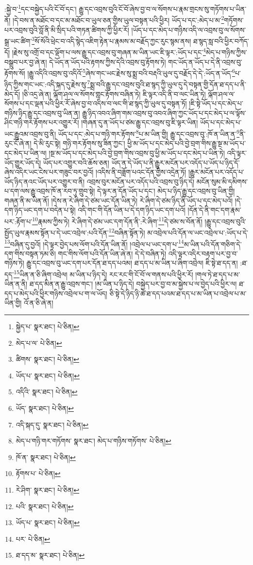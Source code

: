 :སྐྱེ་བ་\footnote{སྐྱེད་པ་  སྣར་ཐང་།  པེ་ཅིན། }དང་བསྐྱེད་པའི་ངོ་བོ་དང་། རྒྱུ་དང་འབྲས་བུའི་ངོ་བོ་ཞེས་བྱ་བ་ལ་སོགས་པ་རྣམ་གྲངས་སུ་གཏོགས་པ་ཡིན་ནོ། །དེ་བས་ན་མཐོང་བ་དང་མ་མཐོང་བ་ཡུལ་ཅན་གྱིས་ཡུལ་བསྟན་པའི་ཕྱིར། ཡོད་པ་དང་:མེད་པ་མ་\footnote{མེད་པ་ལ་  པེ་ཅིན། }གཏོགས་པར་འབྲས་བུའི་བློ་ནི་མི་སྲིད་པའི་གཏན་ཚིགས་ཀྱི་ཕྱིར་རོ། །ཡོད་པ་དང་མེད་པ་གཉིས་འདི་ལ་འབྲས་བུ་ལ་སོགས་སྒྲ་ཡང་ཚིག་\footnote{ཚིགས་  སྣར་ཐང་།  པེ་ཅིན། }སོ་སོའི་ཕྲེང་བ་འདི་སྙེད་འཇིག་རྟེན་པ་རྣམས་མ་བརྗོད་ཀྱང་རུང་སྙམ་ནས། ཐ་སྙད་སླ་བའི་ཕྱིར་བཀོད་དོ། །རྗེས་སུ་འགྲོ་བ་དང་ལྡོག་པ་ལས་རྒྱུ་དང་འབྲས་བུ་གཞན་མ་ཡིན་ཡང་ཇི་ལྟར་:ཡོད་པ་དང་\footnote{ཡོད་པ་  སྣར་ཐང་།  པེ་ཅིན། }མེད་པ་གཉིས་ཀྱིས་བསྒྲུབ་པར་བྱ་ཞེ་ན། དེ་ཡོད་ན་ཡོད་པའི་རྟགས་ཀྱིས་དེའི་འབྲས་བུ་རྟོགས་ཏེ། གང་ཡོད་ན་ཡོད་པ་དེ་ནི་འབྲས་བུ་རྟོགས་སོ། །རྒྱུ་འདིའི་འབྲས་བུ་འདིའོ་\footnote{འདིའི་  སྣར་ཐང་།  པེ་ཅིན། }ཞེས་གང་ཡང་རྗེས་སུ་སྨྲ་བའི་བརྡའི་ཡུལ་དུ་བརྗོད་དེ་དེ་:ཡོད་ན་ཡོད་\footnote{ཡོད་  སྣར་ཐང་།  པེ་ཅིན། }པ་ཉིད་ཀྱིས་གང་ཡང་:འདི་སྐད་དུ་རྗེས་སུ་\footnote{འདི་སྐད་དུ་  སྣར་ཐང་།  པེ་ཅིན། }སྨྲ་བའི་རྒྱུ་དང་འབྲས་བུའི་ཐ་སྙད་ཀྱི་ཡུལ་དུ་དེ་བསྟན་གྱི་དོན་ཐ་དད་པ་ནི་མེད་དོ། །ཅི་འདྲ་ཞེ་ན། ལྐོག་ཤལ་ལ་སོགས་གླང་རྟོགས་བཞིན་ཏེ། ཇི་ལྟར་འདི་ནི་བ་ལང་ཡིན་ཏེ། ལྐོག་ཤལ་ལ་སོགས་པ་དང་ལྡན་པའི་ཕྱིར་རོ་ཞེས་བྱ་བ་འདིས་བ་ལང་གི་ཐ་སྙད་ཀྱི་ཡུལ་དུ་བསྟན་ཏོ། །ཇི་སྟེ་ཡོད་པ་དང་མེད་པ་གཉིས་ཉིད་རྒྱུ་དང་འབྲས་བུ་ཡིན་ན། རྒྱུ་ཉིད་འབའ་ཞིག་གམ་འབྲས་བུ་འབའ་ཞིག་ཀྱང་ཡོད་པ་དང་མེད་པ་ལ་ལྟོས་ཤིང་གཉི་གར་རྟོགས་པར་འགྱུར་རོ། །གཞན་དུ་ན་ཡོད་པ་ཙམ་རྒྱུ་དང་འབྲས་བུ་ཇི་ལྟར་ཡིན། ཡོད་པ་དང་མེད་པ་ཡང་རྒྱུའམ་འབྲས་བུ་ནི། ཡོད་པ་དང་:མེད་པ་གཉི་གར་རྟོགས་\footnote{མེད་པ་གཉི་གར་གཏོགས་  སྣར་ཐང་། མེད་པ་གཉིས་གཏོགས་  པེ་ཅིན། }པ་མ་ཡིན་གྱི། རྒྱུ་དང་འབྲས་བུ་:ཁོ་ན་ཡིན་ན་\footnote{ཁོ་ན་  སྣར་ཐང་།  པེ་ཅིན། }ནི་རུང་ངོ་ཞེ་ན། དེ་མི་རུང་སྟེ། གཉི་གར་རྟོགས་སུ་ཟིན་ཀྱང་། ཕྱི་མ་ཡོད་པ་དང་མེད་པའི་བྱེ་བྲག་གིས་རྒྱུ་སྔ་མ་ཡོད་པ་དང་མེད་པ་ཡིན་ལ། །སྔ་མ་ཡོད་པ་དང་མེད་པའི་བྱེ་བྲག་གིས་འབྲས་བུ་ཕྱི་མ་ཡོད་པ་དང་མེད་པ་ཡིན་ཏེ། འདི་ལྟར་ཡོད་གྱུར་ཡོད་དེ། ཡོད་པར་འགྱུར་བའི་ཆོས་ཅན། ཡོད་ན་དེ་ཡོད་པ་ནི་རྒྱུར་མངོན་པར་འདོད་པ་ཡོད་པ་ཉིད་དོ་ཞེས་འདིར་ཡང་ངེས་པར་གཟུང་བར་བྱའོ། །འདིས་ནི་བཟློག་པའང་དོན་གྱིས་འདྲེན་ཏོ། །རྒྱུར་མངོན་པར་འདོད་པ་ཡོད་ཉིད་ནའང་ཡོད་པར་འགྱུར་བ་ནི། འབྲས་བུར་མངོན་པར་འདོད་པའི་འབྲས་བུ་ཉིད་དེ། མངོན་སུམ་མི་དམིགས་པ་དག་ལས་རྒྱུ་འབྲས་ཁོ་ན་རབ་ཏུ་གྲུབ་སྟེ། དེ་ལྟར་ན་དོན་ཡོད་པ་དང་། མེད་པ་ཉིད་རྒྱུ་དང་འབྲས་བུ་ཡིན་གྱི། གཞན་ནི་མ་ཡིན་ནོ། །དེས་ན་རེ་ཞིག་དེ་ཙམ་ཡང་དོན་ཡིན་ཏེ། རེ་ཞིག་དེ་ཙམ་ཉིད་ནི་ཡོད་པ་དང་མེད་པའོ། །དེ་དག་ཉིད་ཡང་དག་པ་བདེན་པ་སྟེ། འདི་གང་གི་དོན་ཡིན་པ་དེ་དག་ཉིད་ཡང་དག་པའོ། །དོན་དེ་ནི་གང་དག་རྣམ་པར་:རྟོག་པ་\footnote{རྟོགས་པ་  པེ་ཅིན། }རྣམས་ཀྱིས་ཏེ། རེ་ཞིག་དེ་ཙམ་ཡང་དག་དོན་ནི་:རེ་ཞིག་\footnote{རེ་ཤིག་  སྣར་ཐང་།  པེ་ཅིན། }དེ་ཙམ་ས་བོན་ནོ། །རྒྱུ་དང་འབྲས་བུའི་སྤྱོད་ཡུལ་རྣམས་སྟོན་པ་དེ་ཡང་འབྲེལ་:པའི་དོན་\footnote{པའི་  སྣར་ཐང་།  པེ་ཅིན། }བཞིན་སྟོན་ཏེ། མ་འབྲེལ་པའི་དོན་ལ་ཡང་འབྲེལ་པ་:ཡོད་པ་དེ་\footnote{ཡོད་པ་  སྣར་ཐང་།  པེ་ཅིན། }བཞིན་དུ་བྱའོ། །དེ་ལྟར་བྱེད་པས་ལོག་པའི་དོན་ཡིན་ནོ། །འབྲེལ་པ་ཡང་དག་པ་\footnote{པར་  པེ་ཅིན། }མ་ཡིན་པའི་དོན་གཅིག་དེ་དག་གིས་བསྟན་ཏམ་ཅི། གང་གིས་ལོག་པའི་དོན་ཡིན་ཞེ་ན། དེ་དེ་བཞིན་ཏེ། འདི་ལྟར་འདིར་བརྟག་པར་བྱ་བ་གཉིས་ཏེ། རྒྱུ་དང་འབྲས་བུ་ཡང་དག་པར་དོན་ཐ་དད་པའམ། ཐ་དད་པ་མ་ཡིན་པ་ཞིག་འབྲེལ། ཇི་སྟེ་ཐ་དད་ན། :ཐ་དད་\footnote{ཐ་དད་མ་  སྣར་ཐང་།  པེ་ཅིན། }ཡིན་ན་ཅི་ཞིག་འབྲེལ། མ་ཡིན་པ་ཉིད་དེ། རང་རང་གི་ངོ་བོ་ལ་གནས་པའི་ཕྱིར་རོ། །གལ་ཏེ་ཐ་དད་པ་མ་ཡིན་ན་ནི། ཐ་དད་མིན་ན་རྒྱུ་འབྲས་གང་། །མ་ཡིན་པ་ཉིད་དེ། བསྐྱེད་པར་བྱ་བ་མ་སྐྱེས་པ་ལ་བྱེད་པའི་ཕྱིར་ལ། ཐ་དད་པ་མེད་པའི་ཕྱིར་གཉིས་འབྲེལ་པ་ག་ལ་ཡོད། ཅི་སྟེ་དེ་ཉིད་ཉི་ཚེ་ཐ་དད་པའམ་ཐ་དད་པ་མ་ཡིན་པ་འབྲེལ་པ་མ་ཡིན་གྱི། འོ་ན་ཅི་ཞེ་ན། 